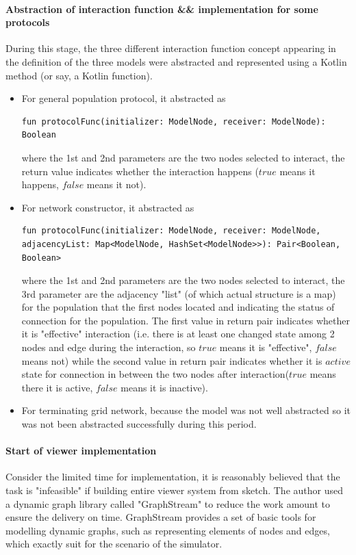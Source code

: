 \paragraph{Abstraction of interaction function \&\& implementation for some protocols}
During this stage, the three different interaction function concept appearing in the definition of the three models
were abstracted and represented using a Kotlin method (or say, a Kotlin function).
\begin{itemize}
  \item For general population protocol, it abstracted as
  \begin{lstlisting}[caption = {Abstraction for population protocol interaction function}, style = mykotlin]
      fun protocolFunc(initializer: ModelNode, receiver: ModelNode): Boolean
  \end{lstlisting}
   where the 1st and 2nd parameters are the two nodes selected to interact, the return value indicates whether the interaction happens ($true$ means it happens, $false$ means it not).
   \item For network constructor, it abstracted as
   \begin{lstlisting}[caption = {Abstraction for network constructor interaction function}, style = mykotlin]
      fun protocolFunc(initializer: ModelNode, receiver: ModelNode, adjacencyList: Map<ModelNode, HashSet<ModelNode>>): Pair<Boolean, Boolean>
   \end{lstlisting}
   where the 1st and 2nd parameters are the two nodes selected to interact, the 3rd parameter are the adjacency "list" (of which actual structure is a map) for the population that the
   first nodes located and indicating the status of connection for the population. The first value in return pair indicates whether it is "effective" interaction
    (i.e. there is at least one changed state among 2 nodes and edge during the interaction, so $true$ means it is "effective", $false$ means not) while the
   second value in return pair indicates whether it is $active$ state for connection in between the two nodes after interaction($true$ means there it is active, $false$ means it is inactive).
   \item For terminating grid network, because the model was not well abstracted so it was not been abstracted successfully during this period.
\end{itemize}
\paragraph{Start of viewer implementation}
Consider the limited time for implementation, it is reasonably believed that the task is "infeasible" if building entire viewer system from sketch. The author used a dynamic
graph library called "GraphStream" \cite{GraphStream} to reduce the work amount to ensure the delivery on time.
GraphStream provides a set of basic tools for modelling dynamic graphs, such as representing elements of nodes and edges, which exactly suit for the scenario of the simulator.
